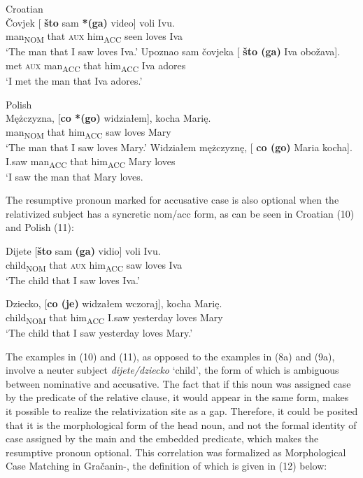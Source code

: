 \documentclass[output=paper]{langsci/langscibook}
\begin{document}
\ea%
    Croatian\label{ex:leska:8}\\
    \ea
    \gll Čovjek   [  \textbf{što}   sam \textbf{*(ga)}   video]   voli   Ivu.\\
          man\textsubscript{NOM}   that \textsc{aux}   him\textsubscript{ACC}   seen   loves   Iva\\
    \glt ‘The man that I saw loves Iva.’
    \ex
    \gll Upoznao   sam čovjeka [  \textbf{što (ga)}   Iva obožava].\\
         met   \textsc{aux} man\textsubscript{ACC}   that him\textsubscript{ACC} Iva adores\\
    \glt ‘I met the man that Iva adores.’
    \z
\z    

\ea%
    Polish\label{ex:leska:9}\\
    \ea
    \gll Mężczyzna, [\textbf{co *(go)}   widziałem],   kocha   Marię.\\
         man\textsubscript{NOM}   that him\textsubscript{ACC}   saw     loves   Mary\\
    \glt ‘The man that I saw loves Mary.’
    \ex
    \gll Widziałem   mężczyznę, [  \textbf{co (go)}   Maria   kocha]. \\
          I.saw     man\textsubscript{ACC}   that him\textsubscript{ACC}   Mary   loves\\
    \glt ‘I saw the man that Mary loves.
    \z
\z
          
The resumptive pronoun marked for accusative case is also optional when the relativized subject has a syncretic nom/acc form, as can be seen in Croatian (10) and Polish (11): 

\ea%
    \label{ex:leska:10}
    \gll Dijete   [\textbf{što} sam \textbf{(ga)}   vidio]   voli   Ivu.\\
         child\textsubscript{NOM}   that \textsc{aux} him\textsubscript{ACC}   saw   loves   Iva\\
    \glt ‘The child that I saw loves Iva.’
    \z

\ea%
    \label{ex:leska:11}
    \gll Dziecko, [\textbf{co (je)}   widzałem   wczoraj],   kocha   Marię.\\
         child\textsubscript{NOM} that him\textsubscript{ACC}  I.saw   yesterday   loves   Mary\\
    \glt ‘The child that I saw yesterday loves Mary.’
    \z

The examples in (10) and (11), as opposed to the examples in (8a) and (9a), involve a neuter subject \textit{dijete/dziecko} ‘child’, the form of which is ambiguous between nominative and accusative. The fact that if this noun was assigned case by the predicate of the relative clause, it would appear in the same form, makes it possible to realize the relativization site as a gap. Therefore, it could be posited that it is the morphological form of the head noun, and not the formal identity of case assigned by the main and the embedded predicate, which makes the resumptive pronoun optional. This correlation was formalized as Morphological Case Matching in Gračanin-\citet[30]{Yuksek2013}, the definition of which is given in (12) below: 
\end{document}
